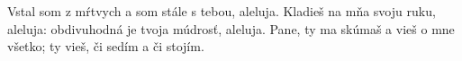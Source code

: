 Vstal som z mŕtvych a som stále s tebou, aleluja. Kladieš na mňa svoju ruku, aleluja: obdivuhodná je tvoja múdrosť, aleluja.
\versseparator Pane, ty ma skúmaš a vieš o mne všetko; ty vieš, či sedím a či stojím.